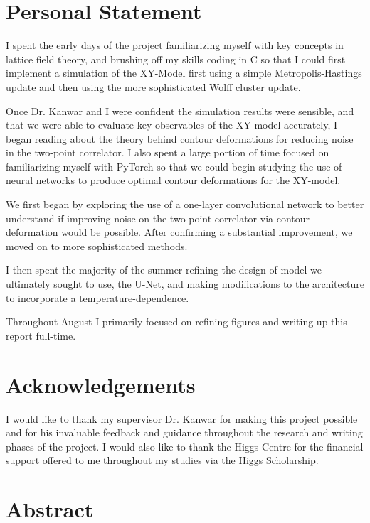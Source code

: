 \documentclass[12pt]{article}
\begin{document}
\newpage

\section*{Personal Statement}

I spent the early days of the project familiarizing myself with key concepts in lattice field theory, and brushing off my skills coding
in C so that I could first implement a simulation of the XY-Model first using a simple Metropolis-Hastings update and then using the more
sophisticated Wolff cluster update.

Once Dr. Kanwar and I were confident the simulation results were sensible, and that we were able to evaluate key observables of the XY-model
accurately, I began reading about the theory behind contour deformations for reducing noise in the two-point correlator. I also spent a large
portion of time focused on familiarizing myself with PyTorch so that we could begin studying the use of neural networks to produce optimal contour
deformations for the XY-model.

We first began by exploring the use of a one-layer convolutional network to better understand if improving noise on the two-point correlator
via contour deformation would be possible. After confirming a substantial improvement, we moved on to more sophisticated methods.

I then spent the majority of the summer refining the design of model we ultimately sought to use, the U-Net, and making modifications to the architecture
to incorporate a temperature-dependence.

Throughout August I primarily focused on refining figures and writing up this report full-time.

\section*{Acknowledgements}

I would like to thank my supervisor Dr. Kanwar for making this project possible and for his invaluable feedback and guidance
throughout the research and writing phases of the project. I would also like to thank the Higgs Centre for the financial support
offered to me throughout my studies via the Higgs Scholarship.

\newpage

\section*{Abstract}
\end{document}

